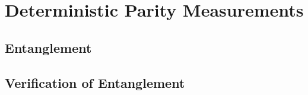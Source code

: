 \chapter{Deterministic Parity Measurements}


\section{Entanglement}

\section{Verification of Entanglement}
